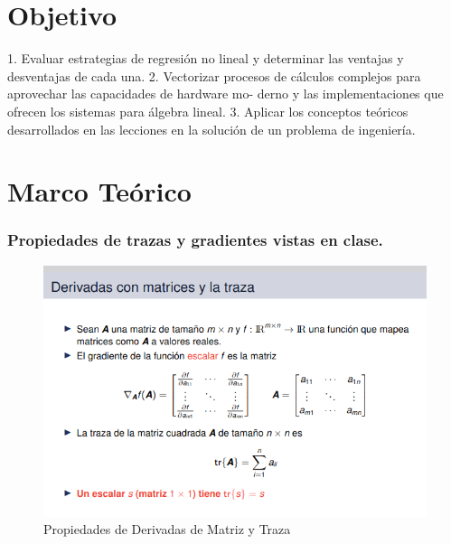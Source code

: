 \documentclass[12pt,letterpaper]{article}
\begin{document}

\section{Objetivo}
1. Evaluar estrategias de regresión no lineal y determinar las ventajas y desventajas de cada
una.
2. Vectorizar procesos de cálculos complejos para aprovechar las capacidades de hardware mo-
derno y las implementaciones que ofrecen los sistemas para álgebra lineal.
3. Aplicar los conceptos teóricos desarrollados en las lecciones en la solución de un problema de
ingeniería.

\section{Marco Teórico}

\subsubsection{Propiedades de trazas y gradientes vistas en clase.}

\begin{figure}[H]
    \centering
    \includegraphics[scale=0.55]{A&A_GAF_HW01/fig/A&A_HW01_01.png}
    \caption{Propiedades de Derivadas de Matriz y Traza \cite{Teoría3.1_p35} } 
    \label{fig:MV4}
\end{figure}
\end{document}
